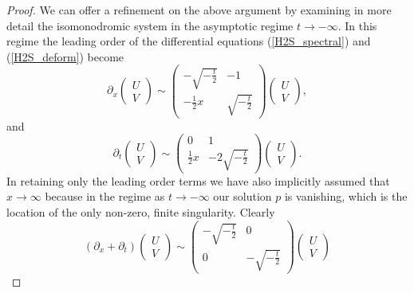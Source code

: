 \documentclass[10pt,reqno]{amsart}
\theoremstyle{plain}
\theoremstyle{definition}
\theoremstyle{remark}
\begin{document}
\begin{proof}
We can offer a refinement on the above argument by examining in more detail the isomonodromic system 
in the asymptotic regime $ t\to -\infty $. In this regime the leading order of the differential equations 
(\ref{H2S_spectral}) and (\ref{H2S_deform}) become
\begin{equation}
 \partial_x \begin{pmatrix}
             U \\ V
            \end{pmatrix}
 \sim \begin{pmatrix}
            -\sqrt{-\frac{t}{2}} & -1 \\ -\frac{1}{2}x & \sqrt{-\frac{t}{2}}
   \end{pmatrix} \begin{pmatrix}
             U \\ V
                 \end{pmatrix} ,
\label{Asympt_spectral}
\end{equation}
and
\begin{equation}
  \partial_t \begin{pmatrix}
             U \\ V
             \end{pmatrix}
 \sim \begin{pmatrix}
            0 & 1 \\ \frac{1}{2}x & -2\sqrt{-\frac{t}{2}} 
           \end{pmatrix}
           \begin{pmatrix}
             U \\ V
            \end{pmatrix} .
\label{Asympt_deform}
\end{equation}
In retaining only the leading order terms we have also implicitly assumed that $ x\to \infty $ because
in the regime as $ t\to -\infty $ our solution $ p $ is vanishing, which is the location of the only non-zero,
finite singularity. Clearly
\begin{equation}
  (\partial_x+\partial_t) \begin{pmatrix}
             U \\ V
             \end{pmatrix}
 \sim \begin{pmatrix}
            -\sqrt{-\frac{t}{2}} & 0 \\ 0 & -\sqrt{-\frac{t}{2}} 
           \end{pmatrix}
           \begin{pmatrix}
             U \\ V

\end{pmatrix}
\end{equation}
\end{proof}
\end{document}
